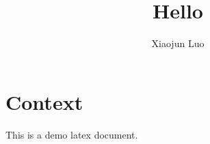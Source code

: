 \documentclass[a4paper,12pt]{article}
\title{Hello}
\author{Xiaojun Luo}
\begin{document}
\maketitle{}

\section{Context}
This is a demo latex document.
\end{document}
